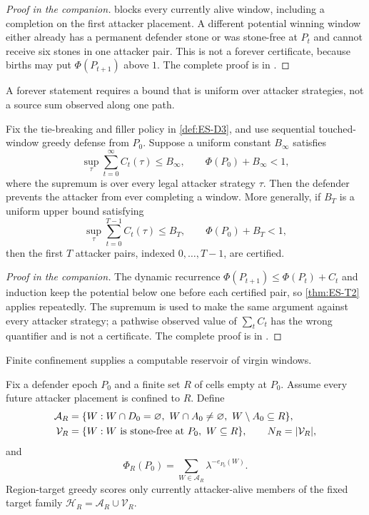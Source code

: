 \begin{proof}[Proof in the companion]
 blocks every currently alive window, including a completion
on the first attacker placement.  A different potential winning window either
already has a permanent defender stone or was stone-free at $P_t$ and cannot
receive six stones in one attacker pair.  This is not a forever certificate,
because births may put $\Phi(P_{t+1})$ above $1$.  The complete proof is in
\cite{hexobot-companions}.
\end{proof}

A forever statement requires a bound that is uniform over attacker
strategies, not a source sum observed along one path.

\begin{theorem}
\label{thm:ES-T3}
Fix the tie-breaking and filler policy in \cref{def:ES-D3}, and use sequential
touched-window greedy defense from $P_0$.  Suppose a uniform constant
$B_\infty$ satisfies
\[
  \sup_{\tau}\sum_{t=0}^{\infty}C_t(\tau)\le B_\infty,
  \qquad \Phi(P_0)+B_\infty<1,
\]
where the supremum is over every legal attacker strategy $\tau$.  Then the
defender prevents the attacker from ever completing a window.  More generally,
if $B_T$ is a uniform upper bound satisfying
\[
  \sup_{\tau}\sum_{t=0}^{T-1}C_t(\tau)\le B_T,
  \qquad \Phi(P_0)+B_T<1,
\]
then the first $T$ attacker pairs, indexed $0,\ldots,T-1$, are certified.
\end{theorem}

\begin{proof}[Proof in the companion]
The dynamic recurrence
$\Phi(P_{t+1})\le\Phi(P_t)+C_t$ and induction keep the potential below one
before each certified pair, so \cref{thm:ES-T2} applies repeatedly.  The
supremum is used to make the same argument against every attacker strategy;
a pathwise observed value of $\sum_t C_t$ has the wrong quantifier and is not
a certificate.  The complete proof is in \cite{hexobot-companions}.
\end{proof}

Finite confinement supplies a computable reservoir of virgin windows.

\begin{definition}
\label{def:ES-D6}
Fix a defender epoch $P_0$ and a finite set $R$ of cells empty at $P_0$.
Assume every future attacker placement is confined to $R$.  Define
\[
\begin{aligned}
  \mathcal A_R&=\{W:W\cap D_0=\varnothing,\ W\cap A_0\ne\varnothing,
                         \ W\setminus A_0\subseteq R\},\\
  \mathcal V_R&=\{W:W\textup{ is stone-free at }P_0,\ W\subseteq R\},
  \qquad N_R=|\mathcal V_R|,
\end{aligned}
\]
and
\[
  \Phi_R(P_0)=\sum_{W\in\mathcal A_R}\lambda^{-e_{P_0}(W)}.
\]
Region-target greedy scores only currently attacker-alive members of the fixed
target family $\mathcal H_R=\mathcal A_R\cup\mathcal V_R$.
\end{definition}

